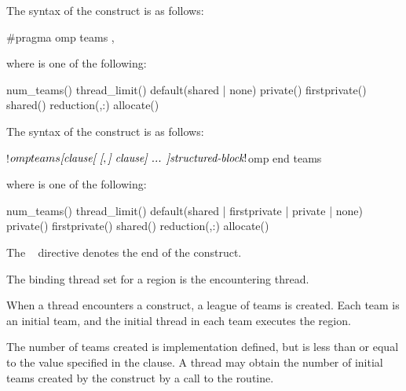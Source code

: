 \syntax
\begin{ccppspecific}
The syntax of the  construct is as follows:

\begin{ompcPragma}
#pragma omp teams \plc{[clause[ [},\plc{] clause] ... ] new-line}
\end{ompcPragma}

where  is one of the following:

\begin{indentedcodelist}
num_teams()
thread_limit()
default(shared \textnormal{|} none)
private()
firstprivate()
shared()
reduction(\plc{[ reduction-modifier},\plc{]reduction-identifier }:)
allocate(\plc{[allocator: ]})
\end{indentedcodelist}
\end{ccppspecific}

\begin{fortranspecific}
The syntax of the  construct is as follows:

\begin{ompfPragma}
!$omp teams \plc{[clause[ [},\plc{] clause] ... ]}
    \plc{structured-block}
!$omp end teams
\end{ompfPragma}


where  is one of the following:

\begin{indentedcodelist}
num_teams()
thread_limit()
default(shared \textnormal{|} firstprivate \textnormal{|} private \textnormal{|} none)
private()
firstprivate()
shared()
reduction(\plc{[ reduction-modifier},\plc{]reduction-identifier }:)
allocate(\plc{[allocator: ]})
\end{indentedcodelist}

The ~ directive denotes the end of the  construct.
\end{fortranspecific}

\begin{samepage}

\binding
The binding thread set for a  region is the encountering thread.

\descr
When a thread encounters a  construct, a league of teams is
created. Each team is an initial team, and the initial thread in each team
executes the  region.

The number of teams created is implementation defined, but is less than or equal to the
value specified in the  clause.
A thread may obtain the number of initial teams created by the construct by a call to the  routine.

\end{samepage}

